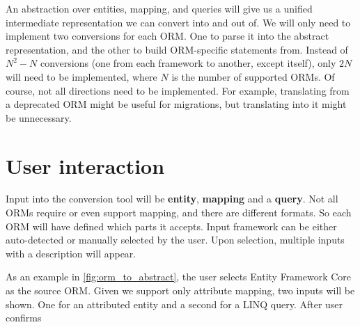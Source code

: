 An abstraction over entities, mapping, and queries will give us a unified intermediate representation we can convert into and out of. We will only need to implement two conversions for each ORM. One to parse it into the abstract representation, and the other to build ORM-specific statements from. Instead of $N^2 - N$ conversions (one from each framework to another, except itself), only $2N$ will need to be implemented, where $N$ is the number of supported ORMs. Of course, not all directions need to be implemented. For example, translating from a deprecated ORM might be useful for migrations, but translating into it might be unnecessary.

\section{User interaction}
Input into the conversion tool will be \textbf{entity}, \textbf{mapping} and a \textbf{query}. Not all ORMs require or even support mapping, and there are different formats. So each ORM will have defined which parts it accepts. Input framework can be either auto-detected or manually selected by the user. Upon selection, multiple inputs with a description will appear.

As an example in \autoref{fig:orm_to_abstract}, the user selects Entity Framework Core as the source ORM. Given we support only attribute mapping, two inputs will be shown. One for an attributed entity and a second for a LINQ query. After user confirms 

